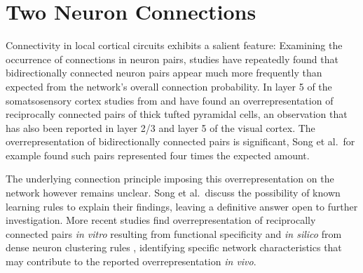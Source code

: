 \newpage

\section{Two Neuron Connections}\label{sec:two_neuron}


Connectivity in local cortical circuits exhibits a salient feature:
Examining the occurrence of connections in neuron pairs, studies have
repeatedly found that bidirectionally connected neuron pairs appear
much more frequently than expected from the network's overall
connection probability. In layer 5 of the somatsosensory cortex
studies from \textcite{Markram1997_TL5} and \textcite{Perin2011} have
found an overrepresentation of reciprocally connected pairs of thick
tufted pyramidal cells, an observation that has also been reported in
layer 2/3 \parencite{Holmgren2003} and layer 5 \parencite{Song2005} of
the visual cortex. The overrepresentation of bidirectionally connected
pairs is significant, Song et al.~for example found such pairs
represented four times the expected amount.

The underlying connection principle imposing this overrepresentation
on the network however remains unclear. Song et al.~discuss the
possibility of known learning rules to explain their findings, leaving
a definitive answer open to further investigation. More recent studies
find overrepresentation of reciprocally connected pairs \textit{in
  vitro} resulting from functional specificity \parencite{Ko2011} and
\textit{in silico} from dense neuron clustering
rules \parencite{Klinshov2014}, identifying specific network
characteristics that may contribute to the reported overrepresentation
\textit{in vivo}. 


